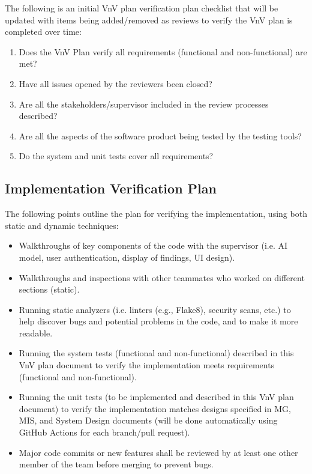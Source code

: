\documentclass[12pt, titlepage]{article}
\begin{document}
\noindent The following is an initial VnV plan verification plan checklist that will be updated with items being added/removed as reviews to verify the VnV plan is completed over time:
\begin{enumerate}[label=$\square$]
    \item Does the VnV Plan verify all requirements (functional and non-functional) are met?
    \item Have all issues opened by the reviewers been closed?
    \item Are all the stakeholders/supervisor included in the review processes described?
    \item Are all the aspects of the software product being tested by the testing tools?
    \item Do the system and unit tests cover all requirements?
\end{enumerate}

\subsection{Implementation Verification Plan}
The following points outline the plan for verifying the implementation, using both static and dynamic techniques:
\begin{itemize}
    \item Walkthroughs of key components of the code with the supervisor (i.e. AI model, user authentication, display of findings, UI design).
    \item Walkthroughs and inspections with other teammates who worked on different sections (static).
    \item Running static analyzers (i.e. linters (e.g., Flake8), security scans,  etc.) to help discover bugs and potential problems in the code, and to make it more readable.
    \item Running the system tests (functional and non-functional) described in this VnV plan document to verify the implementation meets requirements (functional and non-functional).
    \item Running the unit tests (to be implemented and described in this VnV plan document) to verify the implementation matches designs specified in MG, MIS, and System Design documents (will be done automatically using GitHub Actions for each branch/pull request).
    \item Major code commits or new features shall be reviewed by at least one other member of the team before merging to prevent bugs.
\end{itemize}
\end{document}
